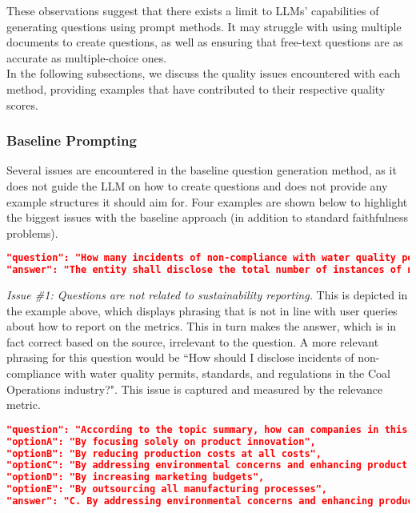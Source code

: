These observations suggest that there exists a limit to LLMs' capabilities of generating questions using prompt methods. It may struggle with using multiple documents to create questions, as well as ensuring that free-text questions are as accurate as multiple-choice ones. \\

In the following subsections, we discuss the quality issues encountered with each method, providing examples that have contributed to their respective quality scores.

\subsubsection{Baseline Prompting} 

Several issues are encountered in the baseline question generation method, as it does not guide the LLM on how to create questions and does not provide any example structures it should aim for. Four examples are shown below to highlight the biggest issues with the baseline approach (in addition to standard faithfulness problems).

\begin{lstlisting}[language=JSON,firstnumber=1,label={lst:memprompt},caption={Question Example 1: Local single-hop free-text}]
"question": "How many incidents of non-compliance with water quality permits, standards, and regulations have occurred for coal operations?",
"answer": "The entity shall disclose the total number of instances of non-compliance, including violations of a technology-based standard and exceedances of quantity and/or quality-based standards.",
\end{lstlisting}

\textit{Issue \#1: Questions are not related to sustainability reporting.} This is depicted in the example above, which displays phrasing that is not in line with user queries about how to report on the metrics. This in turn makes the answer, which is in fact correct based on the source, irrelevant to the question. A more relevant phrasing for this question would be ``How should I disclose incidents of non-compliance with water quality permits, standards, and regulations in the Coal Operations industry?". This issue is captured and measured by the relevance metric.

\begin{lstlisting}[language=JSON,firstnumber=1,label={lst:memprompt},caption={Question Example 2: Local single-hop MCQ}]
"question": "According to the topic summary, how can companies in this industry be better positioned to meet consumer demand and reduce future liabilities?",
"optionA": "By focusing solely on product innovation",
"optionB": "By reducing production costs at all costs",
"optionC": "By addressing environmental concerns and enhancing product take-back",
"optionD": "By increasing marketing budgets",
"optionE": "By outsourcing all manufacturing processes",
"answer": "C. By addressing environmental concerns and enhancing product take-back",
\end{lstlisting}

